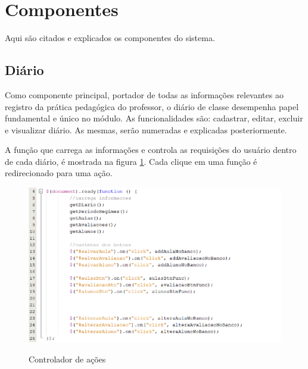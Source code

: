 \section{Componentes}

Aqui são citados e explicados os componentes do sistema.

\subsection{Diário}

Como componente principal, portador de todas as informações relevantes ao registro da prática pedagógica do professor, o diário de classe desempenha papel fundamental e único no módulo. As funcionalidades são: cadastrar, editar, excluir e visualizar diário. As mesmas, serão numeradas e explicadas posteriormente.

A função que carrega as informações e controla as requisições do usuário dentro de cada diário, é mostrada na figura \ref{fig:efetuaAcoes}. Cada clique em uma função é redirecionado para uma ação.


\begin{figure}[!htb]
	\centering
	\caption{ Controlador de ações } %
	\includegraphics[scale=0.4]{efetuaAcoes}\\  %
	{\small } %
	\label{fig:efetuaAcoes} %
\end{figure}



